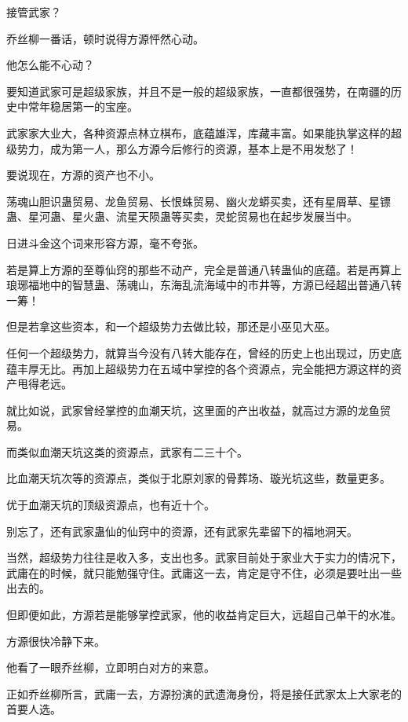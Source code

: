 
\begin{this_body}



接管武家？

乔丝柳一番话，顿时说得方源怦然心动。

他怎么能不心动？

要知道武家可是超级家族，并且不是一般的超级家族，一直都很强势，在南疆的历史中常年稳居第一的宝座。

武家家大业大，各种资源点林立棋布，底蕴雄浑，库藏丰富。如果能执掌这样的超级势力，成为第一人，那么方源今后修行的资源，基本上是不用发愁了！

要说现在，方源的资产也不小。

荡魂山胆识蛊贸易、龙鱼贸易、长恨蛛贸易、幽火龙蟒买卖，还有星屑草、星镖蛊、星河蛊、星火蛊、流星天陨蛊等买卖，灵蛇贸易也在起步发展当中。

日进斗金这个词来形容方源，毫不夸张。

若是算上方源的至尊仙窍的那些不动产，完全是普通八转蛊仙的底蕴。若是再算上琅琊福地中的智慧蛊、荡魂山，东海乱流海域中的市井等，方源已经超出普通八转一筹！

但是若拿这些资本，和一个超级势力去做比较，那还是小巫见大巫。

任何一个超级势力，就算当今没有八转大能存在，曾经的历史上也出现过，历史底蕴丰厚无比。再加上超级势力在五域中掌控的各个资源点，完全能把方源这样的资产甩得老远。

就比如说，武家曾经掌控的血潮天坑，这里面的产出收益，就高过方源的龙鱼贸易。

而类似血潮天坑这类的资源点，武家有二三十个。

比血潮天坑次等的资源点，类似于北原刘家的骨葬场、璇光坑这些，数量更多。

优于血潮天坑的顶级资源点，也有近十个。

别忘了，还有武家蛊仙的仙窍中的资源，还有武家先辈留下的福地洞天。

当然，超级势力往往是收入多，支出也多。武家目前处于家业大于实力的情况下，武庸在的时候，就只能勉强守住。武庸这一去，肯定是守不住，必须是要吐出一些出去的。

但即便如此，方源若是能够掌控武家，他的收益肯定巨大，远超自己单干的水准。

方源很快冷静下来。

他看了一眼乔丝柳，立即明白对方的来意。

正如乔丝柳所言，武庸一去，方源扮演的武遗海身份，将是接任武家太上大家老的首要人选。


\end{this_body}
